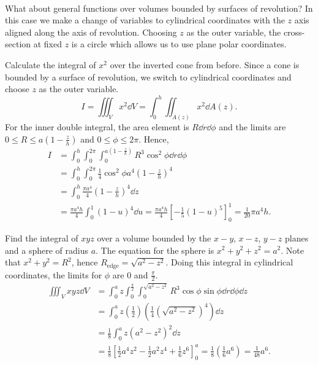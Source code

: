 \documentclass[../multivariate_calculus.tex]{subfiles}
\begin{document}
        \paragraph{}
        What about general functions over volumes bounded by surfaces of revolution?
        In this case we make a change of variables to cylindrical coordinates with the $z$ axis aligned along the axis of revolution.
        Choosing $z$ as the outer variable, the cross-section at fixed $z$ is a circle which allows us to use plane polar coordinates.
        \begin{example}
            Calculate the integral of $x^2$ over the inverted cone from before.
            Since a cone is bounded by a surface of revolution, we switch to cylindrical coordinates and choose $z$ as the outer variable.
            \begin{equation}
                I=\iiint_V x^2\dd{V}=\int_0^h\iint_{A(z)}x^2\dd{A}(z).
            \end{equation}
            For the inner double integral, the area element is $R\dd{r}\dd{\phi}$ and the limits are $0\leq R\leq a\left(1-\frac{z}{h}\right)$ and $0\leq\phi\leq2\pi$.
            Hence,
            \begin{align}
                I&=\int_0^h\int_0^{2\pi}\int_0^{a\left(1-\frac{z}{h}\right)}R^3\cos^2\phi\dd{r}\dd{\phi}\\
                &=\int_0^h\int_0^{2\pi}\frac{1}{4}\cos^2\phi a^4\left(1-\frac{z}{h}\right)^4\\
                &=\int_0^h\frac{\pi a^4}{4}\left(1-\frac{z}{h}\right)^4\dd{z}\\
                &=\frac{\pi a^4h}{4}\int_0^1(1-u)^4\dd{u}=\frac{\pi a^4h}{4}\left[-\frac{1}{5}(1-u)^5\right]_0^1=\frac{1}{20}\pi a^4h.
            \end{align}
        \end{example}
        \begin{example}
            Find the integral of $xyz$ over a volume bounded by the $x-y$, $x-z$, $y-z$ planes and a sphere of radius $a$.
            The equation for the sphere is $x^2+y^2+z^2=a^2$. Note that $x^2+y^2=R^2$, hence $R_\text{edge}=\sqrt{a^2-z^2}$.
            Doing this integral in cylindrical coordinates, the limits for $\phi$ are 0 and $\frac{\pi}{2}$.
            \begin{align}
                \iiint_V xyz\dd{V}&=\int_0^a z\int_0^\frac{\pi}{2}\int_0^{\sqrt{a^2-z^2}}R^3\cos\phi\sin\phi\dd{r}\dd{\phi}\dd{z}\\
                &=\int_0^a z\left(\frac{1}{2}\right)\left(\frac{1}{4}\left(\sqrt{a^2-z^2}\right)^4\right)\dd{z}\\
                &=\frac{1}{8}\int_0^a z(a^2-z^2)^2\dd{z}\\
                &=\frac{1}{8}\left[\frac{1}{2}a^4z^2-\frac{1}{2}a^2z^4+\frac{1}{6}z^6\right]_0^a=\frac{1}{8}\left(\frac{1}{6}a^6\right)=\frac{1}{48}a^6.
            \end{align}
        \end{example}
\end{document}
